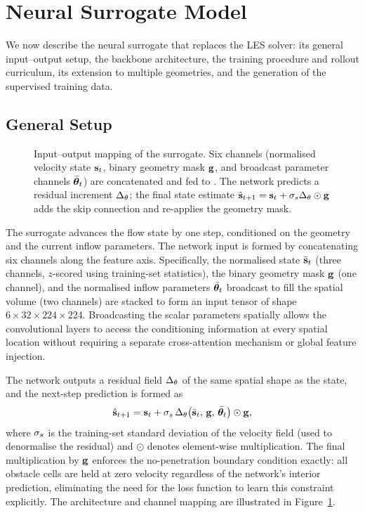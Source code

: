 \section{Neural Surrogate Model}
\label{sec:surrogate}

We now describe the neural surrogate that replaces the LES solver: its general
input--output setup, the backbone architecture, the training procedure and
rollout curriculum, its extension to multiple geometries, and the generation of
the supervised training data.

\subsection{General Setup}
\label{sec:io}

\begin{figure}[t]
  \centering
  
  \caption{Input--output mapping of the \pthreed{} surrogate. Six channels (normalised
    velocity state $\mathbf{s}_t$, binary geometry mask $\mathbf{g}$, and
    broadcast parameter channels $\bar{\boldsymbol{\theta}}_t$) are concatenated
    and fed to \pthreeds{}. The network predicts a residual increment $\Delta_\theta$;
    the final state estimate
    $\hat{\mathbf{s}}_{t+1} = \mathbf{s}_t + \sigma_s \Delta_\theta \odot \mathbf{g}$
    adds the skip connection and re-applies the geometry mask.}
  \label{fig:io}
\end{figure}

The surrogate advances the flow state by one step, conditioned on the geometry
and the current inflow parameters. The network input is formed by concatenating
six channels along the feature
axis. Specifically, the normalised state $\bar{\mathbf{s}}_t$
(three channels, $z$-scored using training-set statistics), the binary geometry
mask $\mathbf{g}$ (one channel), and the normalised inflow parameters
$\bar{\boldsymbol{\theta}}_t$ broadcast to fill the spatial volume (two
channels) are stacked to form an input tensor of shape
$6 \times 32 \times 224 \times 224$. Broadcasting the scalar parameters
spatially allows the convolutional layers to access the conditioning information
at every spatial location without requiring a separate cross-attention mechanism
or global feature injection.

The network outputs a residual field $\Delta_\theta$ of the same spatial shape
as the state, and the next-step prediction is formed as
\begin{equation}
  \hat{\mathbf{s}}_{t+1}
    = \mathbf{s}_t
      + \sigma_s\,\Delta_\theta\!\left(\bar{\mathbf{s}}_t,\,\mathbf{g},\,\bar{\boldsymbol{\theta}}_t\right)
      \odot \mathbf{g},
  \label{eq:step}
\end{equation}
where $\sigma_s$ is the training-set standard deviation of the velocity field
(used to denormalise the residual) and $\odot$ denotes element-wise
multiplication. The final multiplication by $\mathbf{g}$ enforces the
no-penetration boundary condition exactly: all obstacle cells are held at zero
velocity regardless of the network's interior prediction, eliminating the need
for the loss function to learn this constraint explicitly. The architecture and
channel mapping are illustrated in Figure~\ref{fig:io}.

